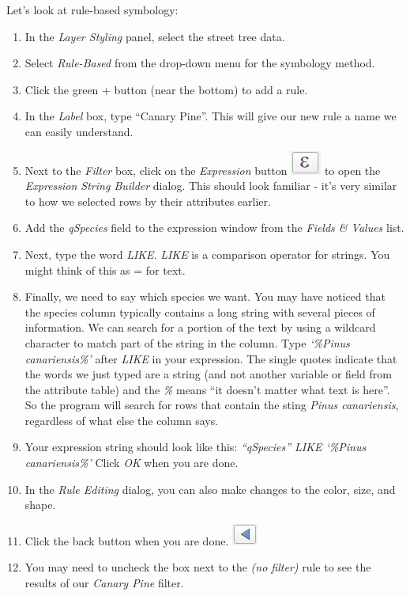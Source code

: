 \documentclass[
]{article}
\providecommand{\tightlist}{%
  \setlength{\itemsep}{0pt}\setlength{\parskip}{0pt}}
\begin{document}
Let's look at rule-based symbology:

\begin{enumerate}
\def\labelenumi{\arabic{enumi}.}
\tightlist
\item
  In the \emph{Layer Styling} panel, select the street tree data.
\item
  Select \emph{Rule-Based} from the drop-down menu for the symbology method.
\item
  Click the green + button (near the bottom) to add a rule.
\item
  In the \emph{Label} box, type ``Canary Pine''. This will give our new rule a name we can easily understand.
\item
  Next to the \emph{Filter} box, click on the \emph{Expression} button \includegraphics{./images/Tool_ExpressionButton.PNG} to open the \emph{Expression String Builder} dialog. This should look familiar - it's very similar to how we selected rows by their attributes earlier.
\item
  Add the \emph{qSpecies} field to the expression window from the \emph{Fields \& Values} list.
\item
  Next, type the word \emph{LIKE}. \emph{LIKE} is a comparison operator for strings. You might think of this as = for text.
\item
  Finally, we need to say which species we want. You may have noticed that the species column typically contains a long string with several pieces of information. We can search for a portion of the text by using a wildcard character to match part of the string in the column. Type \emph{`\%Pinus canariensis\%'} after \emph{LIKE} in your expression. The single quotes indicate that the words we just typed are a string (and not another variable or field from the attribute table) and the \emph{\%} means ``it doesn't matter what text is here''. So the program will search for rows that contain the sting \emph{Pinus canariensis}, regardless of what else the column says.
\item
  Your expression string should look like this: \emph{``qSpecies'' LIKE `\%Pinus canariensis\%'} Click \emph{OK} when you are done.
\item
  In the \emph{Rule Editing} dialog, you can also make changes to the color, size, and shape.
\item
  Click the back button when you are done. \includegraphics{./images/Tool_GoBack.PNG}
\item
  You may need to uncheck the box next to the \emph{(no filter)} rule to see the results of our \emph{Canary Pine} filter.
\end{enumerate}
\end{document}
